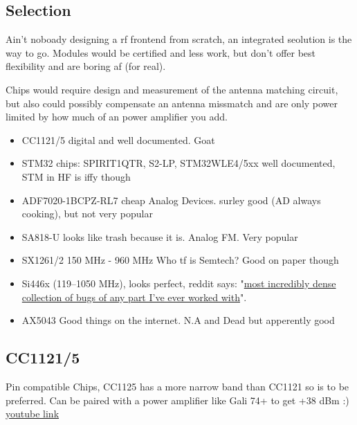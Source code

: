\subsection{Selection}
Ain't noboady designing a rf frontend from scratch,
an integrated seolution is the way to go.
Modules would be certified and less work,
but don't offer best flexibility and are boring af (for real).

Chips would require design and measurement of the antenna matching circuit,
but also could possibly compensate an antenna missmatch
and are only power limited by how much of an power amplifier you add.
\begin{itemize}
	\item CC1121/5 digital and well documented. Goat
	\item STM32 chips: SPIRIT1QTR, S2-LP, STM32WLE4/5xx well documented, STM in HF is iffy though
	\item ADF7020-1BCPZ-RL7 cheap Analog Devices. surley good (AD always cooking), but not very popular
	\item SA818-U looks like trash because it is. Analog FM. Very popular
	\item SX1261/2 150 MHz - 960 MHz Who tf is Semtech? Good on paper though
	\item Si446x (119–1050 MHz), looks perfect, reddit says: "\href{https://www.reddit.com/r/amateurradio/comments/qtlhz3/rf_tranceiver_ics_any_that_cover_2m_125m_70cm_and/}{most incredibly dense collection of bugs of any part I've ever worked with}".
	\item AX5043 Good things on the internet. N.A and Dead but apperently good
\end{itemize}

\subsection{CC1121/5}
Pin compatible Chips, CC1125 has a more narrow band than CC1121 so is to be preferred.
Can be paired with a power amplifier like Gali 74+ to get +38 dBm :) \href{https://www.youtube.com/watch?v=9ZoO_AABzqU&t=313s}{youtube link}


